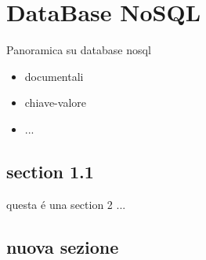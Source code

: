 \chapter{DataBase NoSQL}
Panoramica su database nosql
\begin{itemize}
    \item documentali
    \item chiave-valore
    \item ...
\end{itemize}

\section{section 1.1}
questa é una section 2 ...

\section{nuova sezione}